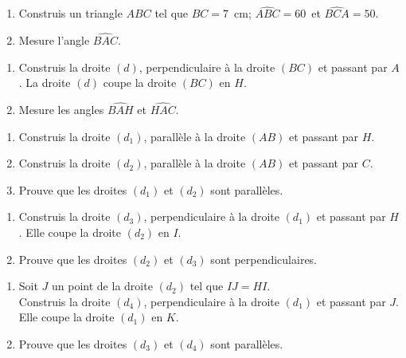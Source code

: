 \begin{myenumerate}
\item
\begin{enumerate}
\item Construis un triangle $ABC$ tel que $BC=7$~cm;
$\widehat{ABC}=60$\degres\ et $\widehat{BCA}=50$\degres.
\item Mesure l'angle $\widehat{BAC}$.
\end{enumerate}
\item
\begin{enumerate}
\item Construis la droite $(d)$, perpendiculaire à la droite $(BC)$ et
passant par $A$. La droite $(d)$ coupe la droite $(BC)$ en $H$.
\item Mesure les angles $\widehat{BAH}$ et $\widehat{HAC}$.
\end{enumerate}
\item
\begin{enumerate}
\item Construis la droite $(d_1)$, parallèle à la droite $(AB)$ et
passant par $H$.
\item Construis la droite $(d_2)$, parallèle à la droite $(AB)$ et
passant par $C$.
\item Prouve que les droites $(d_1)$ et $(d_2)$ sont parallèles.
\end{enumerate}
\item
\begin{enumerate}
\item Construis la droite $(d_3)$, perpendiculaire à la droite $(d_1)$
et passant par $H$. Elle coupe la droite $(d_2)$ en $I$.
\item Prouve que les droites $(d_2)$ et $(d_3)$ sont perpendiculaires.
\end{enumerate}
\item
\begin{enumerate}
\item Soit $J$ un point de la droite $(d_2)$ tel que $IJ=HI$.
\\Construis la droite $(d_4)$, perpendiculaire à la droite $(d_1)$
et passant par $J$. Elle coupe la droite $(d_1)$ en $K$.
\item Prouve que les droites $(d_3)$ et $(d_4)$ sont parallèles.
\end{enumerate}
\end{myenumerate}